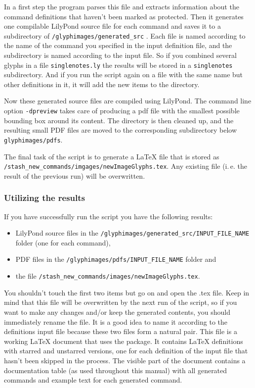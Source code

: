 \documentclass{article}
\begin{document}
In a first step the program parses this file and extracts information about the command definitions that haven't been marked as protected. Then it generates one compilable LilyPond source file for each command and saves it to a subdirectory of \texttt{/glyphimages/generated\_src} .
Each file is named according to the name of the command you specified in the input definition file, and the subdirectory is named according to the input file.
So if you combined several glyphs in a file \texttt{singlenotes.ly} the results will be stored in a \texttt{singlenotes} subdirectory.
And if you run the script again on a file with the same name but other definitions in it, it will add the new items to the directory.

Now these generated source files are compiled using LilyPond. 
The command line option \verb|-dpreview| takes care of producing a pdf file with the smallest possible bounding box around its content.
The directory is then cleaned up, and the resulting small PDF files are moved to the corresponding subdirectory below \texttt{glyphimages/pdfs}.

The final task of the script is to generate a \LaTeX{} file that is stored as \texttt{/stash\_new\_commands/imgages/newImageGlyphs.tex}.
Any existing file (i.\,e. the result of the previous run) will be overwritten.


\subsubsection{Utilizing the results}
\label{subsubsec:BGI_utilizing_results}

If you have successfully run the script you have the following results:
\begin{itemize}
\item LilyPond source files in the \texttt{/glyphimages/generated\_src/INPUT\_FILE\_NAME} folder (one for each command),
\item PDF files in the \texttt{/glyphimages/pdfs/INPUT\_FILE\_NAME} folder and
\item the file \texttt{/stash\_new\_commands/images/newImageGlyphs.tex}.
\end{itemize}
You shouldn't touch the first two items but go on and open the .tex file.
Keep in mind that this file will be overwritten by the next run of the script, so if you want to make any changes and/or keep the generated contents, you should immediately rename the file.
It is a good idea to name it according to the definitions input file because these two files form a natural pair.
This file is a working \LaTeX{} document that uses the \lilyglyphs package.
It contains \LaTeX{}  definitions with starred and unstarred versions, one for each definition of the input file that hasn't been skipped in the process.
The visible part of the document contains a documentation table (as used throughout this manual) with all generated commands and example text for each generated command.
\end{document}
